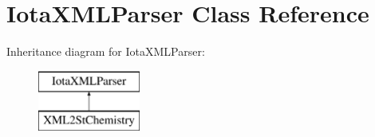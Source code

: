 \hypertarget{interface_iota_x_m_l_parser}{
\section{IotaXMLParser Class Reference}
\label{interface_iota_x_m_l_parser}
}
Inheritance diagram for IotaXMLParser:\begin{figure}[H]
\begin{center}
\leavevmode
\includegraphics[height=2.000000cm]{interface_iota_x_m_l_parser}
\end{center}
\end{figure}
